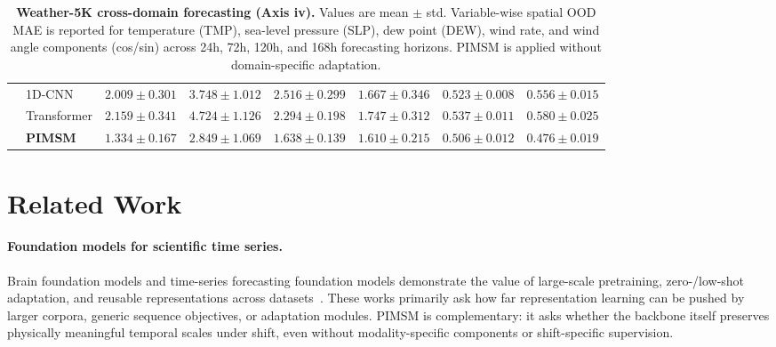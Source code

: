 \documentclass{article}
\begin{document}
\begin{table}[htbp]
\begin{tabular}{llcccccc}
     & 1D-CNN      & $2.009\pm0.301$ & $3.748\pm1.012$ & $2.516\pm0.299$ & $1.667\pm0.346$ & $0.523\pm0.008$ & $0.556\pm0.015$ \\
     & Transformer & $2.159\pm0.341$ & $4.724\pm1.126$ & $2.294\pm0.198$ & $1.747\pm0.312$ & $0.537\pm0.011$ & $0.580\pm0.025$ \\
     & \textbf{PIMSM} & $\mathbf{1.334\pm0.167}$ & $\mathbf{2.849\pm1.069}$ & $\mathbf{1.638\pm0.139}$ & $\mathbf{1.610\pm0.215}$ & $\mathbf{0.506\pm0.012}$ & $\mathbf{0.476\pm0.019}$ \\
\bottomrule
\end{tabular}
\caption{
\textbf{Weather-5K cross-domain forecasting (Axis iv).}
Values are mean $\pm$ std. Variable-wise spatial OOD MAE is reported for temperature (TMP), sea-level pressure (SLP), dew point (DEW), wind rate, and wind angle components (cos/sin) across 24h, 72h, 120h, and 168h forecasting horizons. PIMSM is applied without domain-specific adaptation.
}
\label{tab:weather}
\end{table}


\section{Related Work}
\label{sec:related}

\paragraph{Foundation models for scientific time series.}
Brain foundation models and time-series forecasting foundation models demonstrate the value of large-scale pretraining, zero-/low-shot adaptation, and reusable representations across datasets~\citep{tak2026generalizable,wang2025towards,wang2025slim,wang2026omni,abhimanyu2024decoder,ansari2024chronos,woo2024unified}.
These works primarily ask how far representation learning can be pushed by larger corpora, generic sequence objectives, or adaptation modules.
PIMSM is complementary: it asks whether the backbone itself preserves physically meaningful temporal scales under shift, even without modality-specific components or shift-specific supervision.
\end{document}
